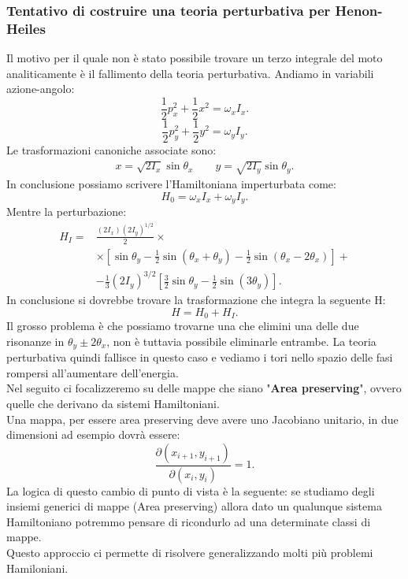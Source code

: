 \subsubsection{Tentativo di costruire una teoria perturbativa per Henon-Heiles}%
\label{subsub:Tentativo di costruire una teoria perturbativa per Henon-Heiles}
Il motivo per il quale non è stato possibile trovare un terzo integrale del moto analiticamente è il fallimento della teoria perturbativa. Andiamo in variabili azione-angolo:
\[
    \frac{1}{2}p_x^2 + \frac{1}{2}x^2 = \omega_xI_x
.\] 
\[
    \frac{1}{2}p_y^2 + \frac{1}{2}y^2 = \omega_yI_y
.\] 
Le trasformazioni canoniche associate sono:
\[\begin{aligned}
    x = \sqrt{2I_x} \sin\theta_x \qquad y = \sqrt{2I_y} \sin\theta_y
.\end{aligned}\]
In conclusione possiamo scrivere l'Hamiltoniana imperturbata come:
\[
    H_0 = \omega_xI_x + \omega_yI_y
.\] 
Mentre la perturbazione:
\[\begin{aligned}
    H_I = &\frac{(2I_x)(2I_y)^{1 /2}}{2}\times\\ 
	  &\times \left[\sin \theta_y-\frac{1}{2}\sin (\theta_x+\theta_y)-\frac{1}{2}\sin (\theta_x-2\theta_x) \right] + \\
	  & - \frac{1}{3}\left(2I_y\right)^{3 /2}\left[\frac{3}{2}\sin\theta_y-\frac{1}{2}\sin (3\theta_y)\right]
.\end{aligned}\]
In conclusione si dovrebbe trovare la trasformazione che integra la seguente H:
\[
    H = H_0+H_I
.\] 
Il grosso problema è che possiamo trovarne una che elimini una delle due risonanze in $\theta_y\pm 2\theta_x$, non è tuttavia possibile eliminarle entrambe. La teoria perturbativa quindi fallisce in questo caso e vediamo i tori nello spazio delle fasi rompersi all'aumentare dell'energia.\\
Nel seguito ci focalizzeremo su delle mappe che siano "\textbf{Area preserving}", ovvero quelle che derivano da sistemi Hamiltoniani.\\
Una mappa, per essere area preserving deve avere uno Jacobiano unitario, in due dimensioni ad esempio dovrà essere:
\[
    \frac{\partial (x_{i+1}, y_{i+1})}{\partial (x_i, y_i)} = 1
.\] 
La logica di questo cambio di punto di vista è la seguente: se studiamo degli insiemi generici di mappe (Area preserving) allora dato un qualunque sistema Hamiltoniano potremmo pensare di ricondurlo ad una determinate classi di mappe. \\
Questo approccio ci permette di risolvere generalizzando molti più problemi Hamiloniani.
